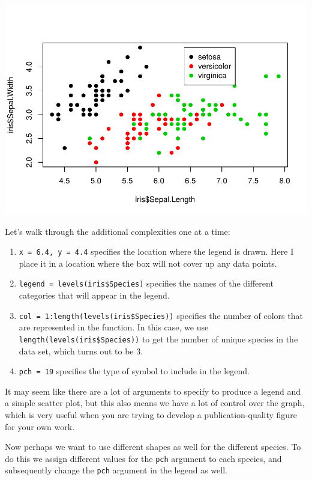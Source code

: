 \documentclass[
]{krantz}
\providecommand{\tightlist}{%
  \setlength{\itemsep}{0pt}\setlength{\parskip}{0pt}}
\begin{document}
\includegraphics{bookdown_files/figure-latex/unnamed-chunk-336-1.pdf}

Let's walk through the additional complexities one at a time:

\begin{enumerate}
\def\labelenumi{\arabic{enumi}.}
\tightlist
\item
  \texttt{x\ =\ 6.4,\ y\ =\ 4.4} specifies the location where the legend is drawn. Here I place it in a location where the box will not cover up any data points.
\item
  \texttt{legend\ =\ levels(iris\$Species)} specifies the names of the different categories that will appear in the legend.
\item
  \texttt{col\ =\ 1:length(levels(iris\$Species))} specifies the number of colors that are represented in the function. In this case, we use \texttt{length(levels(iris\$Species))} to get the number of unique species in the data set, which turns out to be 3.
\item
  \texttt{pch\ =\ 19} specifies the type of symbol to include in the legend.
\end{enumerate}

It may seem like there are a lot of arguments to specify to produce a legend and a simple scatter plot, but this also means we have a lot of control over the graph, which is very useful when you are trying to develop a publication-quality figure for your own work.

Now perhaps we want to use different shapes as well for the different species. To do this we assign different values for the \texttt{pch} argument to each species, and subsequently change the \texttt{pch} argument in the legend as well.
\end{document}
